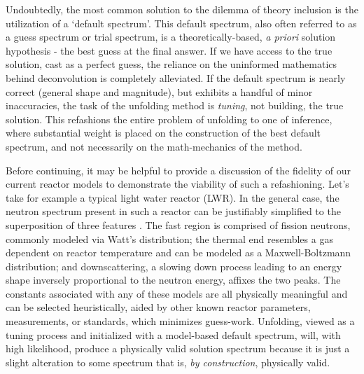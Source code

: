 Undoubtedly, the most common solution to the dilemma of theory inclusion is the utilization of a `default spectrum'.
This default spectrum, also often referred to as a guess spectrum or trial spectrum, is a theoretically-based, {\it a priori} solution hypothesis - the best guess at the final answer.
If we have access to the true solution, cast as a perfect guess, the reliance on the uninformed mathematics behind deconvolution is completely alleviated.
If the default spectrum is nearly correct (general shape and magnitude), but exhibits a handful of minor inaccuracies, the task of the unfolding method is {\it tuning}, not building, the true solution.
This refashions the entire problem of unfolding to one of inference, where substantial weight is placed on the construction of the best default spectrum, and not necessarily on the math-mechanics of the method.

Before continuing, it may be helpful to provide a discussion of the fidelity of our current reactor models to demonstrate the viability of such a refashioning.
Let's take for example a typical light water reactor (LWR).
In the general case, the neutron spectrum present in such a reactor can be justifiably simplified to the superposition of three features \cite{lewis2008fundamentals}.
The fast region is comprised of fission neutrons, commonly modeled via Watt's distribution; the thermal end resembles a gas dependent on reactor temperature and can be modeled as a Maxwell-Boltzmann distribution; and downscattering, a slowing down process leading to an energy shape inversely proportional to the neutron energy, affixes the two peaks.
The constants associated with any of these models are all physically meaningful and can be selected heuristically, aided by other known reactor parameters, measurements, or standards, which minimizes guess-work.
Unfolding, viewed as a tuning process and initialized with a model-based default spectrum, will, with high likelihood, produce a physically valid solution spectrum because it is just a slight alteration to some spectrum that is, {\it by construction}, physically valid.

